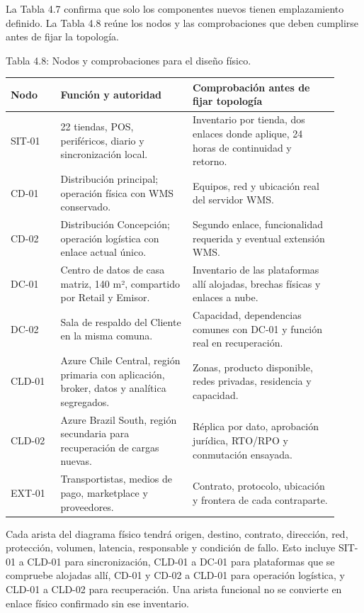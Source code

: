 \documentclass[11pt]{article}
\begin{document}
La Tabla 4.7 confirma que solo los componentes nuevos tienen emplazamiento definido. La Tabla 4.8 reúne los nodos y las comprobaciones que deben cumplirse antes de fijar la topología.

Tabla 4.8: Nodos y comprobaciones para el diseño físico.

\begin{longtable}{@{}p{0.14\linewidth}p{0.37\linewidth}p{0.41\linewidth}@{}}
\toprule Nodo & Función y autoridad & Comprobación antes de fijar topología \\
\midrule\endhead\bottomrule\endlastfoot
SIT-01 & 22 tiendas, POS, periféricos, diario y sincronización local. & Inventario por tienda, dos enlaces donde aplique, 24 horas de continuidad y retorno. \\
CD-01 & Distribución principal; operación física con WMS conservado. & Equipos, red y ubicación real del servidor WMS. \\
CD-02 & Distribución Concepción; operación logística con enlace actual único. & Segundo enlace, funcionalidad requerida y eventual extensión WMS. \\
DC-01 & Centro de datos de casa matriz, 140 m², compartido por Retail y Emisor. & Inventario de las plataformas allí alojadas, brechas físicas y enlaces a nube. \\
DC-02 & Sala de respaldo del Cliente en la misma comuna. & Capacidad, dependencias comunes con DC-01 y función real en recuperación. \\
CLD-01 & Azure Chile Central, región primaria con aplicación, broker, datos y analítica segregados. & Zonas, producto disponible, redes privadas, residencia y capacidad. \\
CLD-02 & Azure Brazil South, región secundaria para recuperación de cargas nuevas. & Réplica por dato, aprobación jurídica, RTO/RPO y conmutación ensayada. \\
EXT-01 & Transportistas, medios de pago, marketplace y proveedores. & Contrato, protocolo, ubicación y frontera de cada contraparte. \\
\end{longtable}

Cada arista del diagrama físico tendrá origen, destino, contrato, dirección, red, protección, volumen, latencia, responsable y condición de fallo. Esto incluye SIT-01 a CLD-01 para sincronización, CLD-01 a DC-01 para plataformas que se compruebe alojadas allí, CD-01 y CD-02 a CLD-01 para operación logística, y CLD-01 a CLD-02 para recuperación. Una arista funcional no se convierte en enlace físico confirmado sin ese inventario.
\end{document}
